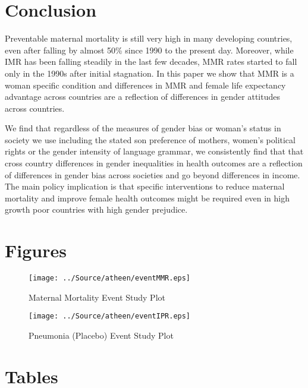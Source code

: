 \documentclass[11pt]{article}
\begin{document}
\begin{spacing}{1.4}
\section{Conclusion}

Preventable maternal mortality is still very high in many developing countries, even after falling by almost 50\% since 1990 to the present day. Moreover, while IMR has been falling steadily in the last few decades, MMR rates started to fall only in the 1990s after initial stagnation. In this paper we show that MMR is a woman specific condition and differences in MMR and female life expectancy advantage across countries are a reflection of differences in gender attitudes across countries. 

We find that regardless of the measures of gender bias or woman's status in society we use including the stated son preference of mothers, women's political rights or the gender intensity of language grammar, we consistently find that  that cross country differences in gender inequalities in health outcomes are a reflection of differences in gender bias across societies and go beyond differences in income. The main policy implication is that specific interventions to reduce maternal mortality and improve female health outcomes might be required even in high growth poor countries with high gender prejudice.

\newpage



\newpage
\section*{Figures}
\begin{figure}[htpb!]
\caption{Maternal Mortality Event Study Plot}
\label{eventMMR}
\texttt{[image: ../Source/atheen/eventMMR.eps]}
\end{figure}

\begin{figure}[htpb!]
\caption{Pneumonia (Placebo) Event Study Plot}
\label{eventIPR}
\texttt{[image: ../Source/atheen/eventIPR.eps]}
\end{figure}

\newpage
\section*{Tables}






\begin{landscape}

\end{landscape}
\begin{landscape}

\end{landscape}
\begin{landscape}

\end{landscape}




\end{spacing}
\end{document}
